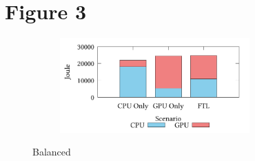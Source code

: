 \documentclass[]{article}
\begin{document}


\clearpage

\section*{Figure 3}


\setcounter{figure}{2}
\renewcommand{\thefigure}{\arabic{figure}a}
\begin{figure}[!h]
\centering
\begin{subfigure}[b]{\mysize}
\centering
\includegraphics[width=0.8\textwidth]{figures_original/alternating.energy.pdf}
\renewcommand{\thesubfigure}{Original}
\caption{}
\end{subfigure}
\begin{subfigure}[b]{\mysize}
\centering
{}
\renewcommand{\thesubfigure}{Reproduced}
\caption{}
\end{subfigure}
\caption{Balanced}
\end{figure}
\end{document}
